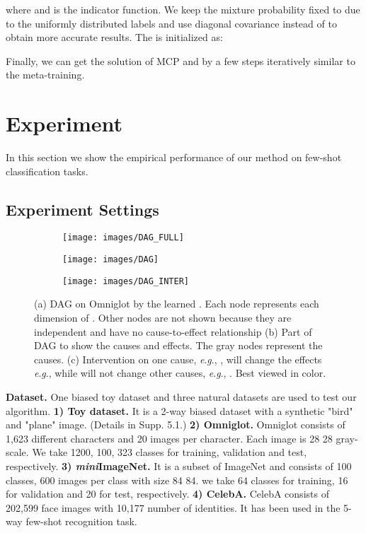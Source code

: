 \documentclass[letterpaper]{article} \usepackage{aaai23}  \usepackage{times}  \usepackage{helvet}  \usepackage{courier}  \usepackage[hyphens]{url}  \usepackage{graphicx} \urlstyle{rm} \def\UrlFont{\rm}  \usepackage{natbib}  \usepackage{caption} \frenchspacing  \setlength{\pdfpagewidth}{8.5in}  \setlength{\pdfpageheight}{11in}  \usepackage{algorithm}
\newcommand{\eg}{\textit{e}.\textit{g}.}
\theoremstyle{plain}
\theoremstyle{definition}
\theoremstyle{remark}
\begin{document}
where   and  is the indicator function. We keep the mixture probability fixed to  due to the uniformly distributed labels and use diagonal covariance  instead of  to obtain more accurate results. The  is initialized as:

Finally, we can get the solution of MCP and   by a few steps iteratively similar to the meta-training. 

\section{Experiment} 
In this section we show the empirical performance of our method on few-shot classification tasks.




\subsection{Experiment Settings}

\begin{figure}[]   
	\centering
	\begin{subfigure}[t]{.15\textwidth}
		\centering
		\texttt{[image: images/DAG\_FULL]}
		\caption{}
		\label{fig:dag_a_full}
	\end{subfigure}
	\hfill
\begin{subfigure}[t]{.15\textwidth}
		\centering
		\texttt{[image: images/DAG]}
		\caption{}
		\label{fig:dag_a}
	\end{subfigure}
	\hfill
	\begin{subfigure}[t]{.15\textwidth}
		\centering
		\texttt{[image: images/DAG\_INTER]}
		\caption{}
		\label{fig:dag_b}
	\end{subfigure}	
\caption{ (a) DAG on Omniglot by the learned . Each node represents each dimension of . Other nodes are not shown because they are independent and have no cause-to-effect relationship (b) Part of DAG to show the causes and effects. The gray nodes represent the causes. (c) Intervention on one cause, \eg, , will change the effects \eg,  while will not change other causes, \eg, . Best viewed in color.}	
	\label{fig:dags}


\end{figure}


\noindent\textbf{Dataset.} One biased toy dataset and three natural datasets are used to test our algorithm. \textbf{1) Toy dataset.} It is a 2-way biased dataset with a synthetic "bird" and "plane" image. (Details in Supp. 5.1.)  \textbf{2) Omniglot.} Omniglot consists of 1,623 different characters and 20 images per character. Each image is 28  28 gray-scale. We take 1200, 100, 323 classes for training, validation and test, respectively. \textbf{3) \textit{mini}ImageNet.} It is a subset of ImageNet \cite{russakovsky2015imagenet} and consists of 100 classes, 600 images per class with size 84  84. we take 64 classes for training, 16 for validation	and 20 for test, respectively. \textbf{4) CelebA.} CelebA consists of 202,599 face images with 10,177 number of identities. It has been used in the 5-way few-shot recognition task.
\end{document}

